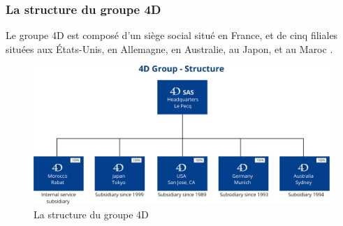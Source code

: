


\subsubsection{La structure du groupe 4D}
Le groupe 4D est composé d’un siège social situé en France, et de cinq filiales situées
aux États-Unis, en Allemagne, en Australie, au Japon, et au Maroc \cite{4d}.

\begin{figure}[h]
    \centering
    \includegraphics[scale=0.32]{Images/groupe.png} %
    \caption{ La structure du groupe 4D}
    \label{fig:groupe}
\end{figure}

